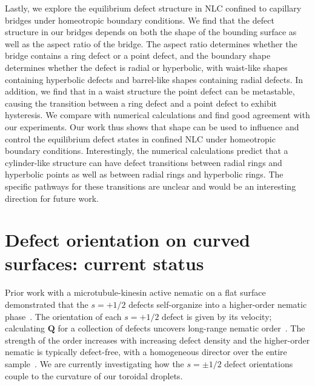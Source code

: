 Lastly, we explore the equilibrium defect structure in NLC confined to capillary bridges under homeotropic boundary conditions.
We find that the defect structure in our bridges depends on both the shape of the bounding surface as well as the aspect ratio of the bridge.
The aspect ratio determines whether the bridge contains a ring defect or a point defect, and the boundary shape determines whether the defect is radial or hyperbolic, with waist-like shapes containing hyperbolic defects and barrel-like shapes containing radial defects.
In addition, we find that in a waist structure the point defect can be metastable, causing the transition between a ring defect and a point defect to exhibit hysteresis.
We compare with numerical calculations and find good agreement with our experiments.
Our work thus shows that shape can be used to influence and control the equilibrium defect states in confined NLC under homeotropic boundary conditions.
Interestingly, the numerical calculations predict that a cylinder-like structure can have defect transitions between radial rings and hyperbolic points as well as between radial rings and hyperbolic rings.
The specific pathways for these transitions are unclear and would be an interesting direction for future work.

\section{Defect orientation on curved surfaces: current status}
Prior work with a microtubule-kinesin active nematic on a flat surface demonstrated that the $s = +1/2$ defects self-organize into a higher-order nematic phase~\cite{RN27}.
The orientation of each $s = +1/2$ defect is given by its velocity; calculating $\mathbf{Q}$ for a collection of defects uncovers long-range nematic order~\cite{RN27}.
The strength of the order increases with increasing defect density and the higher-order nematic is typically defect-free, with a homogeneous director over the entire sample~\cite{RN27}.
We are currently investigating how the $s = \pm 1/2$ defect orientations couple to the curvature of our toroidal droplets.



